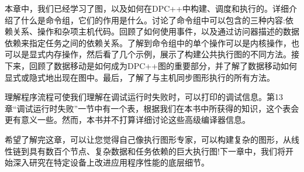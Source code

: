 本章中，我们已经学习了图，以及如何在DPC++中构建、调度和执行的。详细介绍了什么是命令组，它们的作用是什么。讨论了命令组中可以包含的三种内容:依赖关系、操作和杂项主机代码。回顾了如何使用事件，以及通过访问器描述的数据依赖来指定任务之间的依赖关系。了解到命令组中的单个操作可以是内核操作，也可以是显式内存操作，然后看了几个示例，展示了构建公共执行图的不同方法。接下来，回顾了数据移动是如何成为DPC++图的重要部分，并了解了数据移动如何显式或隐式地出现在图中。最后，了解了与主机同步图形执行的所有方法。\par

理解程序流程可使我们理解在调试运行时失败时，可以打印的调试信息。第13章“调试运行时失败”一节中有一个表，根据我们在本书中所获得的知识，这个表会更有意义一些。然而，本书并不打算详细讨论这些高级编译器信息。\par

希望了解完这章，可以让您觉得自己像执行图形专家，可以构建复杂的图形，从线性链到具有数百个节点、复杂数据和任务依赖的巨大执行图!下一章中，我们将开始深入研究在特定设备上改进应用程序性能的底层细节。\par


\newpage







